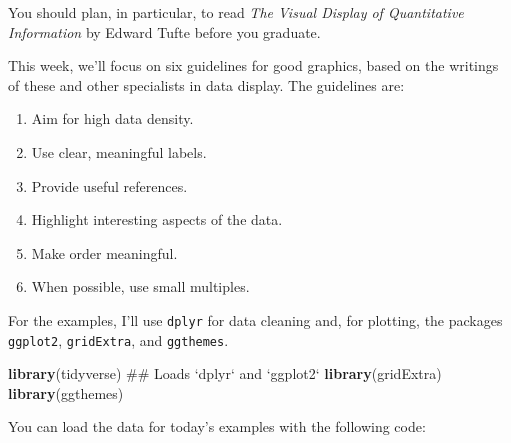 \documentclass[]{book}
\makeatletter
\newenvironment{Shaded}{\begin{snugshade}}{\end{snugshade}}
\newcommand{\KeywordTok}[1]{\textcolor[rgb]{0.13,0.29,0.53}{\textbf{#1}}}
\newcommand{\DecValTok}[1]{\textcolor[rgb]{0.00,0.00,0.81}{#1}}
\newcommand{\StringTok}[1]{\textcolor[rgb]{0.31,0.60,0.02}{#1}}
\newcommand{\OperatorTok}[1]{\textcolor[rgb]{0.81,0.36,0.00}{\textbf{#1}}}
\newcommand{\NormalTok}[1]{#1}
\providecommand{\tightlist}{%
  \setlength{\itemsep}{0pt}\setlength{\parskip}{0pt}}
\newenvironment{kframe}{%
\medskip{}
\setlength{\fboxsep}{.8em}
 \def\at@end@of@kframe{}%
 \ifinner\ifhmode%
  \def\at@end@of@kframe{\end{minipage}}%
  \begin{minipage}{\columnwidth}%
 \fi\fi%
 \def\FrameCommand##1{\hskip\@totalleftmargin \hskip-\fboxsep
 \colorbox{shadecolor}{##1}\hskip-\fboxsep
     \hskip-\linewidth \hskip-\@totalleftmargin \hskip\columnwidth}%
 \MakeFramed {\advance\hsize-\width
   \@totalleftmargin\z@ \linewidth\hsize
   \@setminipage}}%
 {\par\unskip\endMakeFramed%
 \at@end@of@kframe}
\renewenvironment{Shaded}{\begin{kframe}}{\end{kframe}}
\theoremstyle{definition}
\theoremstyle{definition}
\theoremstyle{definition}
\theoremstyle{remark}
\makeatother
\begin{document}
You should plan, in particular, to read \emph{The Visual Display of
Quantitative Information} by Edward Tufte before you graduate.

This week, we'll focus on six guidelines for good graphics, based on the
writings of these and other specialists in data display. The guidelines
are:

\begin{enumerate}
\def\labelenumi{\arabic{enumi}.}
\tightlist
\item
  Aim for high data density.
\item
  Use clear, meaningful labels.
\item
  Provide useful references.
\item
  Highlight interesting aspects of the data.
\item
  Make order meaningful.
\item
  When possible, use small multiples.
\end{enumerate}

For the examples, I'll use \texttt{dplyr} for data cleaning and, for
plotting, the packages \texttt{ggplot2}, \texttt{gridExtra}, and
\texttt{ggthemes}.

\begin{Shaded}
\begin{Highlighting}[]
\KeywordTok{library}\NormalTok{(tidyverse) ## Loads `dplyr` and `ggplot2`}
\KeywordTok{library}\NormalTok{(gridExtra)}
\KeywordTok{library}\NormalTok{(ggthemes)}
\end{Highlighting}
\end{Shaded}

You can load the data for today's examples with the following code:

\begin{Shaded}
\end{Shaded}
\end{document}
